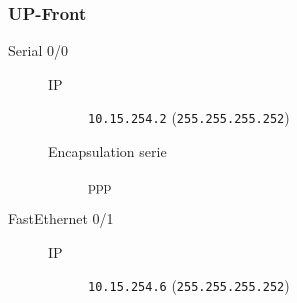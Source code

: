\subsubsection{UP-Front}

	\begin{description}
		\item[Serial 0/0] 
		\begin{description}
			\item[IP] \texttt{10.15.254.2} (\texttt{255.255.255.252})
			\item[Encapsulation serie] ppp
		\end{description}

		\item[FastEthernet 0/1] 
		\begin{description}
			\item[IP] \texttt{10.15.254.6} (\texttt{255.255.255.252})
		\end{description}

	\end{description}
